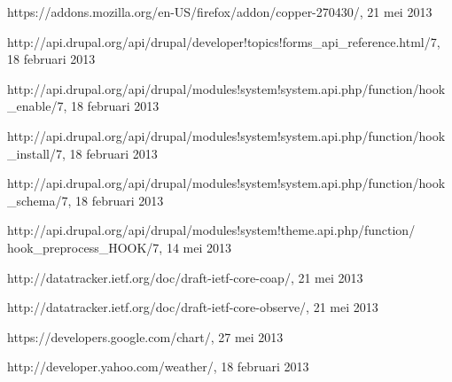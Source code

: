\begin{thebibliography}{99}

 
 



 https://addons.mozilla.org/en-US/firefox/addon/copper-270430/, 21 mei 2013

 http://api.drupal.org/api/drupal/developer!topics!forms\_api\_reference.html/7, 18 februari 2013

 http://api.drupal.org/api/drupal/modules!system!system.api.php/function/hook\_enable/7, 18 februari 2013

 http://api.drupal.org/api/drupal/modules!system!system.api.php/function/hook\_install/7, 18 februari 2013

 http://api.drupal.org/api/drupal/modules!system!system.api.php/function/hook\_schema/7, 18 februari 2013

 http://api.drupal.org/api/drupal/modules!system!theme.api.php/function/ hook\_preprocess\_HOOK/7, 14 mei 2013

 http://datatracker.ietf.org/doc/draft-ietf-core-coap/, 21 mei 2013

 http://datatracker.ietf.org/doc/draft-ietf-core-observe/, 21 mei 2013

 https://developers.google.com/chart/, 27 mei 2013

 http://developer.yahoo.com/weather/, 18 februari 2013


\end{thebibliography}

